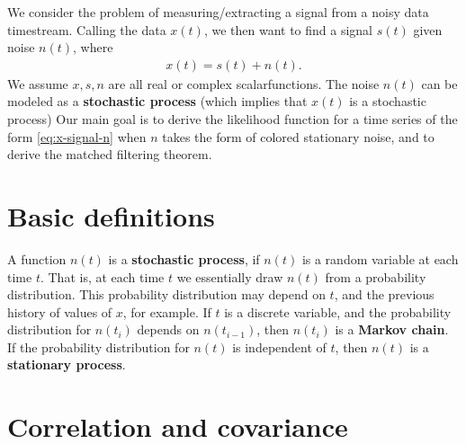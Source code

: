 We consider the problem of measuring/extracting a signal from a noisy data timestream.
Calling the data $x(t)$, we then want to find a signal $s(t)$ given noise $n(t)$, where
\begin{align}
    \label{eq:x-signal-n}
    x\left(t\right) = s\left(t\right) + n\left(t\right)
    .
\end{align}
We assume $x,s,n$ are all real or complex scalarfunctions.
The noise $n(t)$ can be modeled as a \textbf{stochastic process} (which implies that $x(t)$ is a stochastic process)
Our main goal is to derive the likelihood function for a time series of the form
\eqref{eq:x-signal-n} when $n$ takes the form of colored stationary noise, and
to derive the matched filtering theorem.

\section{Basic definitions}

A function $n(t)$ is a \textbf{stochastic process}, if $n(t)$ is a random variable at each time $t$.
That is, at each time $t$ we essentially draw $n(t)$ from a probability distribution.
This probability distribution may depend on $t$, and the previous history of values of $x$, for example.
If $t$ is a discrete variable, and the probability distribution for $n(t_i)$ depends on $n(t_{i-1})$, then $n(t_i)$ is a \textbf{Markov chain}.
If the probability distribution for $n(t)$ is independent of $t$, then $n(t)$ is a \textbf{stationary process}.

\section{Correlation and covariance}

